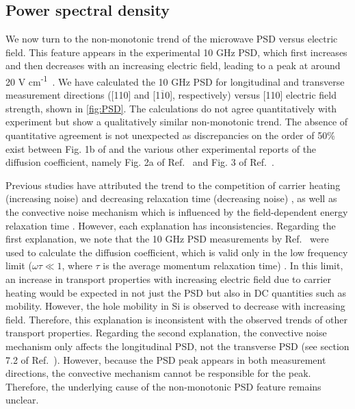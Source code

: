 \documentclass[aps,prx,preprint,letterpaper,groupedaddress,longbibliography]{revtex4-2}
\theoremstyle{definition}
\newcommand{\smalleunits}{V cm\textsuperscript{-1}}
\begin{document}
\subsection{Power spectral density}

We now turn to the non-monotonic trend of the microwave PSD versus electric field. This feature appears in the experimental 10 GHz PSD, which first increases and then decreases with an increasing electric field, leading to a peak at around 20 \smalleunits~\cite{Bareikis:1980,Bareikis:1981}. We have calculated the 10 GHz PSD for longitudinal and transverse measurement directions ([110] and [1$\overline{1}$0], respectively) versus [110] electric field strength, shown in \cref{fig:PSD}. The calculations do not agree quantitatively with experiment but show a qualitatively similar non-monotonic trend. The absence of quantitative agreement is not unexpected as discrepancies on the order of 50\% exist between Fig. 1b of \cite{Bareikis:1980} and the various other experimental reports of the diffusion coefficient, namely Fig. 2a of Ref.~\cite{Reggiani:1980} and Fig. 3 of Ref.~\cite{Gasquet:1986}.


Previous studies have attributed the trend to the competition of carrier heating (increasing noise) and decreasing relaxation time (decreasing noise) \cite{Bareikis:1981}, as well as the convective noise mechanism which is influenced by the field-dependent energy relaxation time \cite{Hartnagel:2001}. However, each explanation has inconsistencies. Regarding the first explanation, we note that the 10 GHz PSD measurements by Ref.~\cite{Bareikis:1980,Bareikis:1981} were used to calculate the diffusion coefficient, which is valid only in the low frequency limit ($\omega \tau \ll 1$, where $\tau$ is the average momentum relaxation time) \cite{Gantsevich:1979}. In this limit, an increase in transport properties with increasing electric field due to carrier heating would be expected in not just the PSD but also in DC quantities such as mobility. However, the hole mobility in Si is observed to decrease with increasing field. Therefore, this explanation is inconsistent with the observed trends of other transport properties. Regarding the second explanation, the convective noise mechanism only affects the longitudinal PSD, not the transverse PSD (see section 7.2 of Ref.~\cite{Hartnagel:2001}). However, because the PSD peak appears in both measurement directions, the convective mechanism cannot be responsible for the peak. Therefore, the underlying cause of the non-monotonic PSD feature remains unclear.\par
\end{document}
